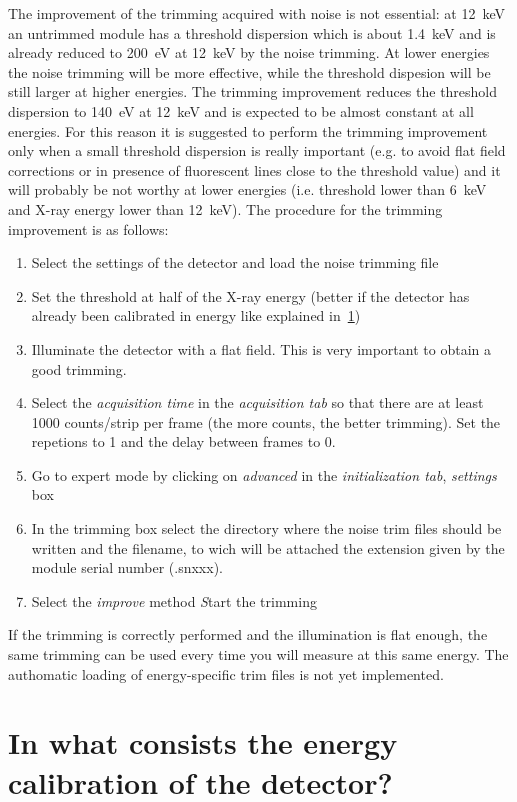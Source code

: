 The improvement of the trimming acquired with noise is not essential: at 12~keV an untrimmed module has a threshold dispersion which is about 1.4~keV and is already reduced to 200~eV at 12~keV by the noise trimming. At lower energies the noise trimming will be more effective, while the threshold dispesion will be still larger at higher energies. The trimming improvement reduces the threshold dispersion to 140~eV at 12~keV and is expected to be almost constant at all energies. For this reason it is suggested to perform the trimming improvement only when a small threshold dispersion is really important (e.g. to avoid flat field corrections or in presence of fluorescent lines close to the threshold value) and it will probably be not worthy at lower energies (i.e. threshold lower than 6~keV and X-ray energy lower than 12~keV). 
The procedure for the trimming improvement is as follows:
\begin{enumerate}
\item Select the settings of the detector and load the noise trimming file
\item Set the threshold at half of the X-ray energy (better if the detector has already been calibrated in energy like explained in~\ref{sec:encal})
\item Illuminate the detector with a flat field. This is very important to obtain a good trimming. 
\item Select the \textit{acquisition time} in the \textit{acquisition tab} so that there are at least 1000 counts/strip per frame (the more counts, the better trimming). Set the repetions to 1 and the delay between frames to 0.
\item Go to expert mode by clicking on \textit{advanced} in the \textit{initialization tab}, \textit{settings} box
\item In the trimming box  select the directory where the noise trim files should be written and the filename, to wich will be attached the extension given by the module serial number (.snxxx).
\item Select the \textit{improve} method
\textit Start the trimming
\end{enumerate}
If the trimming is correctly performed and the illumination is flat enough, the same trimming can be used every time you will measure at this same energy.
The authomatic loading of energy-specific trim files is not yet implemented.

\section{In what consists the energy calibration of the detector?}\label{sec:encal}

